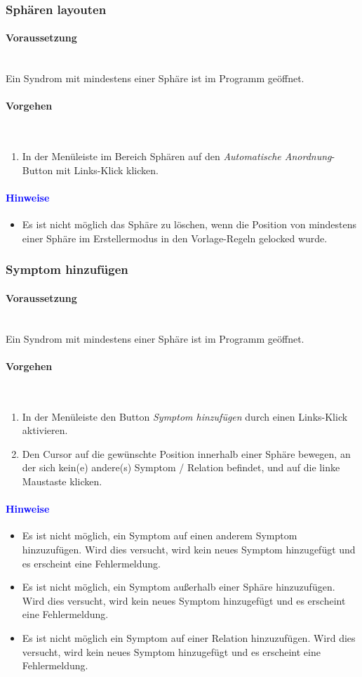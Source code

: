 \documentclass[enabledeprecatedfontcommands,fontsize=11pt,paper=a4,twoside]{scrartcl}
\newcommand*{\hint}{\paragraph{\textcolor{blue}{Hinweise}}}
\newcommand*{\condition}{\paragraph{Voraussetzung}$\;$ \vspace{0.2cm}\\}
\newcommand*{\actions}{\paragraph{Vorgehen} $\;$\vspace{0.2cm}\\}
\begin{document}
				\newpage	
		\subsubsection{Sphären layouten}
				\condition 	
		Ein Syndrom mit mindestens einer Sphäre ist im Programm geöffnet. 
		\actions  
		\begin{enumerate}
			\item In der Menüleiste im Bereich Sphären auf den \textit{Automatische Anordnung}-Button mit Links-Klick klicken.
		\end{enumerate}
		\hint
		\begin{itemize}
			\item Es ist nicht möglich das Sphäre zu löschen, wenn die Position von mindestens einer Sphäre im Erstellermodus in den Vorlage-Regeln gelocked wurde.
			\end{itemize}
		
				\newpage	
		\subsubsection{Symptom hinzufügen}
		\condition 	
		Ein Syndrom mit mindestens einer Sphäre ist im Programm geöffnet. 
		\actions
		\begin{enumerate}
			\item In der Menüleiste den Button \textit{Symptom hinzufügen} durch einen Links-Klick aktivieren.
			\item Den Cursor auf die gewünschte Position innerhalb einer Sphäre bewegen, an der sich kein(e) andere(s) Symptom / Relation befindet, und auf die linke Maustaste klicken.
		\end{enumerate}
		\hint
		\begin{itemize}
			\item Es ist nicht möglich, ein Symptom auf einen anderem Symptom hinzuzufügen. Wird dies versucht, wird kein neues Symptom hinzugefügt und es erscheint eine Fehlermeldung.
			\item Es ist nicht möglich, ein Symptom außerhalb einer Sphäre hinzuzufügen. Wird dies versucht, wird kein neues Symptom hinzugefügt und es erscheint eine Fehlermeldung.
			\item Es ist nicht möglich ein Symptom auf einer Relation hinzuzufügen. Wird dies versucht, wird kein neues Symptom hinzugefügt und es erscheint eine Fehlermeldung.
		\end{itemize}
\end{document}
